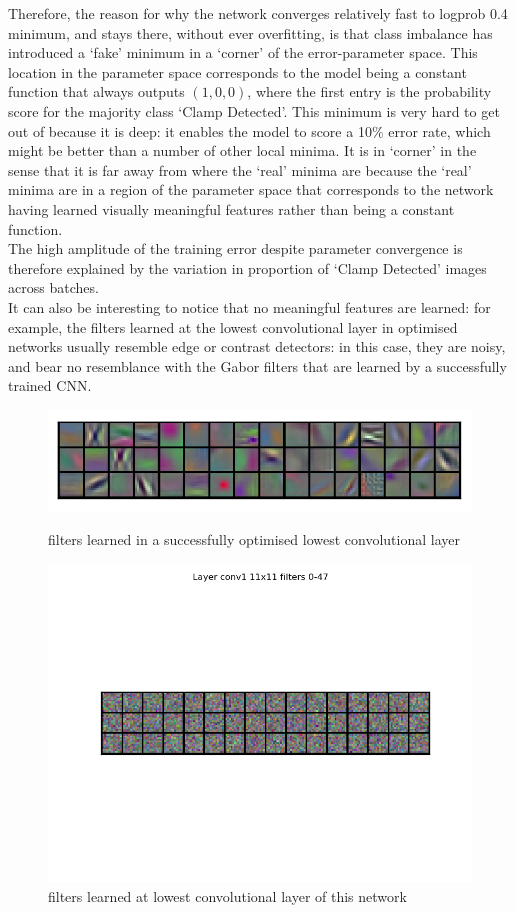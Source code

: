\documentclass[a4paper,11pt]{article}
\begin{document}
Therefore, the reason for why the network converges relatively fast to logprob 0.4 minimum, and stays there, without ever overfitting, is that class imbalance has introduced a `fake' minimum in a `corner' of the error-parameter space. This location in the parameter space corresponds to the model being a constant function that always outputs $(1, 0, 0)$, where the first entry is the probability score for the majority class `Clamp Detected'. This minimum is very hard to get out of because it is deep: it enables the model to score a 10\% error rate, which might be better than a number of other local minima. It is in  `corner' in the sense that it is far away from where the `real' minima are because the `real' minima are in a region of the parameter space that corresponds to the network having learned visually meaningful features rather than being a constant function. \\

The high amplitude of the training error despite parameter convergence is therefore explained by the variation in proportion of `Clamp Detected' images across batches. \\

It can also be interesting to notice that no meaningful features are learned: for example, the filters learned at the lowest convolutional layer in optimised networks usually resemble edge or contrast detectors: in this case, they are noisy, and bear no resemblance with the Gabor filters that are learned by a successfully trained CNN. 

\begin{figure}[h!]
	\centering
	\includegraphics[scale=0.5]{images/good_filters.png} %
	\caption{filters learned in a successfully optimised lowest convolutional layer} 
	\includegraphics[scale=0.5]{images/bad_filters.png}  %
	\caption{filters learned at lowest convolutional layer of this network}
    \label{f30}
\end{figure}
\end{document}
